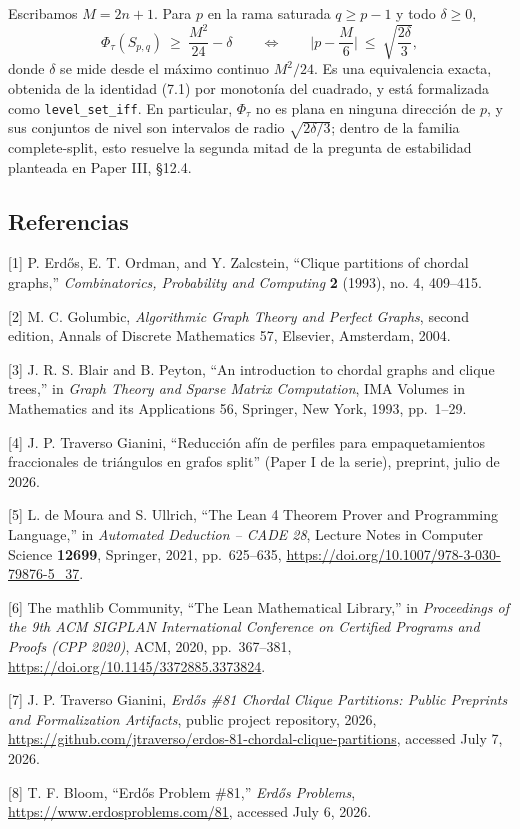 \documentclass[spanish,11pt,a4paper]{article}
\begin{document}
Escribamos \(M=2n+1\). Para \(p\) en la rama saturada \(q\ge p-1\) y
todo \(\delta\ge0\), \[
\Phi_\tau(S_{p,q})\ \ge\ \frac{M^2}{24}-\delta\qquad\Longleftrightarrow\qquad \Big|p-\frac{M}{6}\Big|\ \le\ \sqrt{\frac{2\delta}{3}},
\] donde \(\delta\) se mide desde el máximo continuo \(M^2/24\). Es una
equivalencia exacta, obtenida de la identidad (7.1) por monotonía del
cuadrado, y está formalizada como \nolinkurl{level_set_iff}. En
particular, \(\Phi_\tau\) no es plana en ninguna dirección de \(p\), y
sus conjuntos de nivel son intervalos de radio \(\sqrt{2\delta/3}\);
dentro de la familia complete-split, esto resuelve la segunda mitad de
la pregunta de estabilidad planteada en Paper III, §12.4.

\subsection{Referencias}\label{referencias}

{[}1{]} P. Erdős, E. T. Ordman, and Y. Zalcstein, ``Clique partitions of
chordal graphs,'' \emph{Combinatorics, Probability and Computing}
\textbf{2} (1993), no. 4, 409--415.

{[}2{]} M. C. Golumbic, \emph{Algorithmic Graph Theory and Perfect
Graphs}, second edition, Annals of Discrete Mathematics 57, Elsevier,
Amsterdam, 2004.

{[}3{]} J. R. S. Blair and B. Peyton, ``An introduction to chordal
graphs and clique trees,'' in \emph{Graph Theory and Sparse Matrix
Computation}, IMA Volumes in Mathematics and its Applications 56,
Springer, New York, 1993, pp.~1--29.

{[}4{]} J. P. Traverso Gianini, ``Reducción afín de perfiles para
empaquetamientos fraccionales de triángulos en grafos split'' (Paper I
de la serie), preprint, julio de 2026.

{[}5{]} L. de Moura and S. Ullrich, ``The Lean 4 Theorem Prover and
Programming Language,'' in \emph{Automated Deduction -- CADE 28},
Lecture Notes in Computer Science \textbf{12699}, Springer, 2021,
pp.~625--635, \url{https://doi.org/10.1007/978-3-030-79876-5_37}.

{[}6{]} The mathlib Community, ``The Lean Mathematical Library,'' in
\emph{Proceedings of the 9th ACM SIGPLAN International Conference on
Certified Programs and Proofs (CPP 2020)}, ACM, 2020, pp.~367--381,
\url{https://doi.org/10.1145/3372885.3373824}.

{[}7{]} J. P. Traverso Gianini, \emph{Erdős \#81 Chordal Clique
Partitions: Public Preprints and Formalization Artifacts}, public
project repository, 2026,
\url{https://github.com/jtraverso/erdos-81-chordal-clique-partitions},
accessed July 7, 2026.

{[}8{]} T. F. Bloom, ``Erdős Problem \#81,'' \emph{Erdős Problems},
\url{https://www.erdosproblems.com/81}, accessed July 6, 2026.
\end{document}
